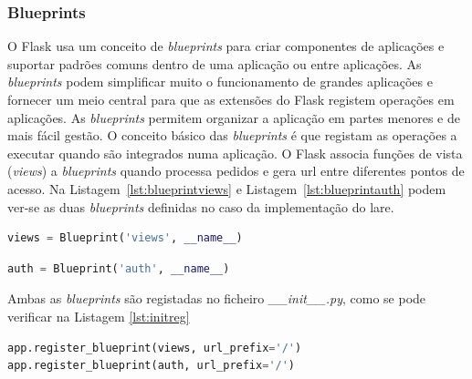 \subsubsection{Blueprints}
O Flask usa um conceito de \textit{blueprints} para criar componentes de aplicações e suportar padrões comuns dentro de uma aplicação ou entre aplicações. As \textit{blueprints} podem simplificar muito o funcionamento de grandes aplicações e fornecer um meio central para que as extensões do Flask registem operações em aplicações. As \textit{blueprints} permitem organizar a aplicação em partes menores e de mais fácil gestão. O conceito básico das \textit{blueprints} é que registam as operações a executar quando são integrados numa aplicação. O Flask associa funções de vista (\textit{views}) a \textit{blueprints} quando processa pedidos e gera \acrshort{url} entre diferentes pontos de acesso. Na Listagem~\ref{lst:blueprintviews} e Listagem~\ref{lst:blueprintauth} podem ver-se as duas \textit{blueprints} definidas no caso da implementação do \acrshort{lare}.

\begin{center}
	\begin{minipage}{0.7\linewidth}
		\begin{lstlisting}[language=Python, caption=\textit{Blueprint views} - \textit{views.py}, label=lst:blueprintviews]
views = Blueprint('views', __name__)
\end{lstlisting}
	\end{minipage}
\end{center}

\begin{center}
	\begin{minipage}{0.7\linewidth}
		\begin{lstlisting}[language=Python, caption=\textit{Blueprint auth} - \textit{auth.py}, label=lst:blueprintauth]
auth = Blueprint('auth', __name__)
\end{lstlisting}
	\end{minipage}
\end{center}

Ambas as \textit{blueprints} são registadas no ficheiro \textit{\_\_init\_\_.py}, como se pode verificar na Listagem \ref{lst:initreg}

\begin{center}
	\begin{minipage}{0.7\linewidth}
		\begin{lstlisting}[language=Python, caption=Registo das \textit{blueprints} - \textit{\_\_init\_\_.py}, label=lst:initreg]
app.register_blueprint(views, url_prefix='/')
app.register_blueprint(auth, url_prefix='/')
\end{lstlisting}
	\end{minipage}
\end{center}

